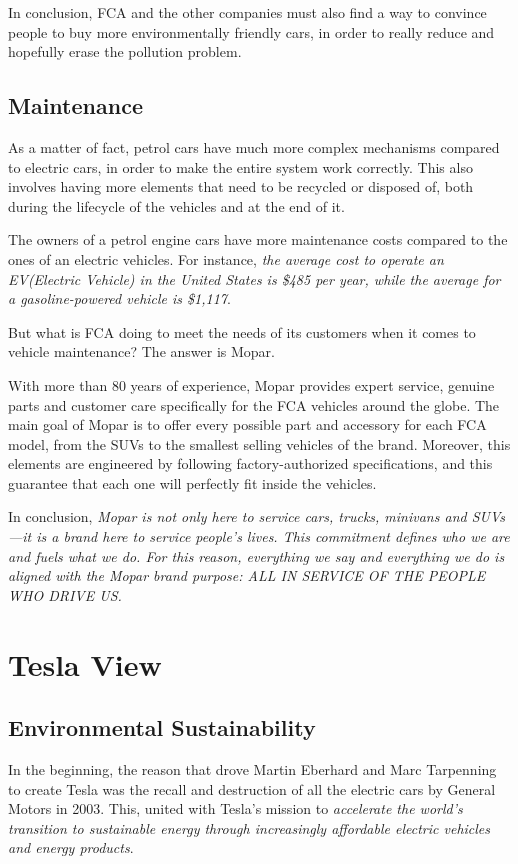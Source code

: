 In conclusion, FCA and the other companies must also find a way to convince people to buy more environmentally friendly cars, in order to really reduce and hopefully erase the pollution problem.

\subsection{Maintenance}

As a matter of fact, petrol cars have much more complex mechanisms compared to electric cars, in order to make the entire system work correctly. This also involves having more elements that need to be recycled or disposed of, both during the lifecycle of the vehicles and at the end of it.

The owners of a petrol engine cars have more maintenance costs compared to the ones of an electric vehicles. For instance, \emph{the average cost to operate an EV(Electric Vehicle) in the United States is \$485 per year, while the average for a gasoline-powered vehicle is \$1,117}\cite{maintenance_costs}. 

But what is FCA doing to meet the needs of its customers when it comes to vehicle maintenance? The answer is Mopar. 

With more than 80 years of experience, Mopar provides expert service, genuine parts and customer care specifically for the FCA vehicles around the globe\cite{maintenance_mopar}. 
The main goal of Mopar is to offer every possible part and accessory for each FCA model, from the SUVs to the smallest selling vehicles of the brand. Moreover, this elements are engineered by following factory-authorized specifications, and this guarantee that each one will perfectly fit inside the vehicles\cite{maintenance_mopar}.

In conclusion, \emph{Mopar is not only here to service cars, trucks, minivans and SUVs—it is a brand here to service people’s lives. This commitment defines who we are and fuels what we do. For this reason, everything we say and everything we do is aligned with the Mopar brand purpose:
ALL IN SERVICE OF THE PEOPLE WHO DRIVE US.}\cite{maintenance_mopar}

\section{Tesla View}

\subsection{Environmental Sustainability}
In the beginning, the reason that drove Martin Eberhard and Marc Tarpenning to create Tesla was the recall and destruction of all the electric cars by General Motors\cite{muskGM} in 2003. This, united with Tesla's mission to \emph{accelerate the world’s transition to sustainable energy through increasingly affordable electric vehicles and energy products}\cite{aboutTesla}.

